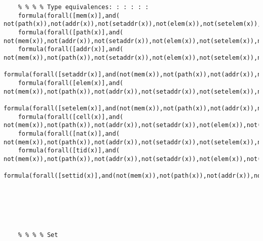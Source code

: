 \begin{lstlisting}
    % % % % Type equivalences: : : : : : 
    formula(forall([mem(x)],and(    not(path(x)),not(addr(x)),not(setaddr(x)),not(elem(x)),not(setelem(x)),not(cell(x)),not(nat(x)),not(tid(x)),not(settid(x)))),mem_is_not_other_type_tllign).
    formula(forall([path(x)],and(   not(mem(x)),not(addr(x)),not(setaddr(x)),not(elem(x)),not(setelem(x)),not(cell(x)),not(nat(x)),not(tid(x)),not(settid(x)))),path_is_not_other_type_tllign).
    formula(forall([addr(x)],and(   not(mem(x)),not(path(x)),not(setaddr(x)),not(elem(x)),not(setelem(x)),not(cell(x)),not(nat(x)),not(tid(x)),not(settid(x)))),addr_is_not_other_type_tllign).
    formula(forall([setaddr(x)],and(not(mem(x)),not(path(x)),not(addr(x)),not(elem(x)),not(setelem(x)),not(cell(x)),not(nat(x)),not(tid(x)),not(settid(x)))),setaddr_is_not_other_type_tllign).
    formula(forall([elem(x)],and(   not(mem(x)),not(path(x)),not(addr(x)),not(setaddr(x)),not(setelem(x)),not(cell(x)),nat(x),not(tid(x)),not(settid(x)))),elem_is_not_other_type_tllign).
    formula(forall([setelem(x)],and(not(mem(x)),not(path(x)),not(addr(x)),not(setaddr(x)),not(elem(x)),not(cell(x)),not(nat(x)),not(tid(x)),not(settid(x)))),setelem_is_not_other_type_tllign).
    formula(forall([cell(x)],and(   not(mem(x)),not(path(x)),not(addr(x)),not(setaddr(x)),not(elem(x)),not(setelem(x)),not(nat(x)),not(tid(x)),not(settid(x)))),cell_is_not_other_type_tllign).
    formula(forall([nat(x)],and(    not(mem(x)),not(path(x)),not(addr(x)),not(setaddr(x)),not(setelem(x)),not(cell(x)),not(settid(x)))),nat_is_not_other_type_tllign).
    formula(forall([tid(x)],and(    not(mem(x)),not(path(x)),not(addr(x)),not(setaddr(x)),not(elem(x)),not(setelem(x)),not(cell(x)),nat(x),not(settid(x)))),tid_is_not_other_type_tllign).
    formula(forall([settid(x)],and(not(mem(x)),not(path(x)),not(addr(x)),not(setaddr(x)),not(elem(x)),not(setelem(x)),not(cell(x)),not(nat(x)),not(tid(x)))),settid_is_not_other_type_tllign).






    % % % % Set



\end{lstlisting}
